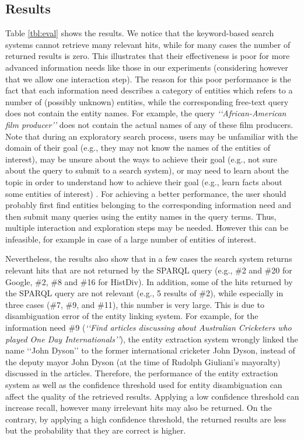 \documentclass[twocolumn]{svjour3}
\newcommand{\q}[1]{\lq\lq{}{}#1\rq\rq{}{}}
\begin{document}
\subsection{Results}
Table \ref{tbl:eval} shows the results.
We notice that the keyword-based search systems
cannot retrieve many relevant hits, while for many cases
the number of returned results is zero.
This illustrates that their effectiveness is
poor for more advanced information needs like those in our experiments
(considering however that we allow one interaction step).
The reason for this poor performance is the fact that each information
need describes a category of entities which refers to a number of
(possibly unknown) entities,
while the corresponding free-text query does not contain the entity names.
For example, the query {\em \q{African-American film producer}}
does not contain the actual names of any of these film producers.
Note that during an exploratory search process,
users may be unfamiliar with the domain of their goal
(e.g., they may not know the names of the entities of interest),
may be unsure about the ways to achieve their goal (e.g., not sure about the query to submit
to a search system),
or may need to learn about the topic in order to understand how to achieve their
goal (e.g., learn facts about some entities of interest) \cite{marchionini2006exploratory}.
For achieving a better performance, the user should probably
first find entities belonging to the corresponding information need and
then submit many queries using the entity names in the query terms.
Thus, multiple interaction and exploration steps may be needed.
However this can be infeasible, for example in case
of a large number of entities of interest.


Nevertheless, the results also show that in a few cases
the search system returns relevant hits that
are not returned by the SPARQL query
(e.g., \#2 and \#20 for Google, \#2, \#8 and \#16 for HistDiv).
In addition, some of the hits returned by the SPARQL query
are not relevant (e.g., 5 results of \#2),
while especially in three cases (\#7, \#9, and \#11),
this number is very large.
This is due to disambiguation error
of the entity linking system.
For example, for the information need \#9
({\em \q{Find articles discussing about Australian Cricketers
who played One Day Internationals}}),
the entity extraction system wrongly linked the name \q{John Dyson}
to the former international cricketer John Dyson,
instead of the deputy mayor John Dyson (at the time of Rudolph Giuliani's mayoralty)
discussed in the articles.
Therefore, the performance of the entity extraction system as well as
the confidence threshold used for entity disambiguation can
affect the quality  of the retrieved results.
Applying a low confidence threshold can increase recall, however
many irrelevant hits may also be returned.
On the contrary, by applying a high confidence threshold,
the returned results are less but the probability that they are correct is higher.
\end{document}
